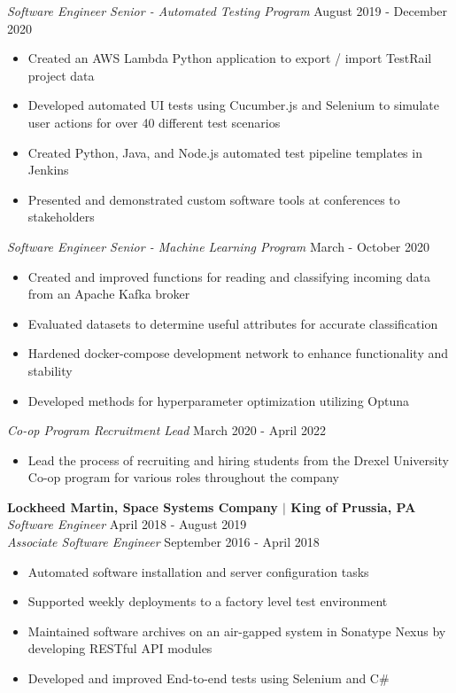 \documentclass[line,resmargin]{res}
\begin{document}
\begin{resume}
{\sl Software Engineer Senior - Automated Testing Program} \hfill August 2019 - December 2020
	\begin{itemize} \itemsep -2pt
		\item Created an AWS Lambda Python application to export / import TestRail project data
		\item Developed automated UI tests using Cucumber.js and Selenium to simulate user actions for over 40 different test scenarios
		\item Created Python, Java, and Node.js automated test pipeline templates in Jenkins
		\item Presented and demonstrated custom software tools at conferences to stakeholders
	\end{itemize}
	
{\sl Software Engineer Senior - Machine Learning Program} \hfill March - October 2020
	\begin{itemize} \itemsep -2pt
		\item Created and improved functions for reading and classifying incoming data from an Apache Kafka broker
		\item Evaluated datasets to determine useful attributes for accurate classification
		\item Hardened docker-compose development network to enhance functionality and stability
		\item Developed methods for hyperparameter optimization utilizing Optuna
	\end{itemize}
	
{\sl Co-op Program Recruitment Lead} \hfill March 2020 - April 2022
	\begin{itemize} \itemsep -2pt
		\item Lead the process of recruiting and hiring students from the Drexel University Co-op program for various roles throughout the company
	\end{itemize}

\textbf{Lockheed Martin, Space Systems Company $|$ King of Prussia, PA} \\
{\sl Software Engineer} \hfill April 2018 - August 2019 \\
{\sl Associate Software Engineer} \hfill September 2016 - April 2018
	\begin{itemize}  \itemsep -2pt
		\item Automated software installation and server configuration tasks
		\item Supported weekly deployments to a factory level test environment
		\item Maintained software archives on an air-gapped system in Sonatype Nexus by developing RESTful API modules
		\item Developed and improved End-to-end tests using Selenium and C\#
	\end{itemize}
				

\end{resume}
\end{document}
